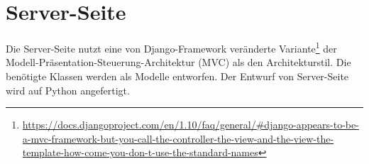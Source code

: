 \documentclass[a4paper]{scrreprt}
\begin{document}
    \chapter{Server-Seite}
        Die Server-Seite nutzt eine von Django-Framework veränderte Variante\footnote{\href{https://docs.djangoproject.com/en/1.10/faq/general/\#django-appears-to-be-a-mvc-framework-but-you-call-the-controller-the-view-and-the-view-the-template-how-come-you-don-t-use-the-standard-names}{https://docs.djangoproject.com/en/1.10/faq/general/\#django-appears-to-be-a-mvc-framework-but-you-call-the-controller-the-view-and-the-view-the-template-how-come-you-don-t-use-the-standard-names}} der Modell-Präsentation-Steuerung-Architektur (MVC) als den Architekturstil. Die benötigte Klassen werden als Modelle entworfen. Der Entwurf von Server-Seite wird auf Python angefertigt.
\end{document}
